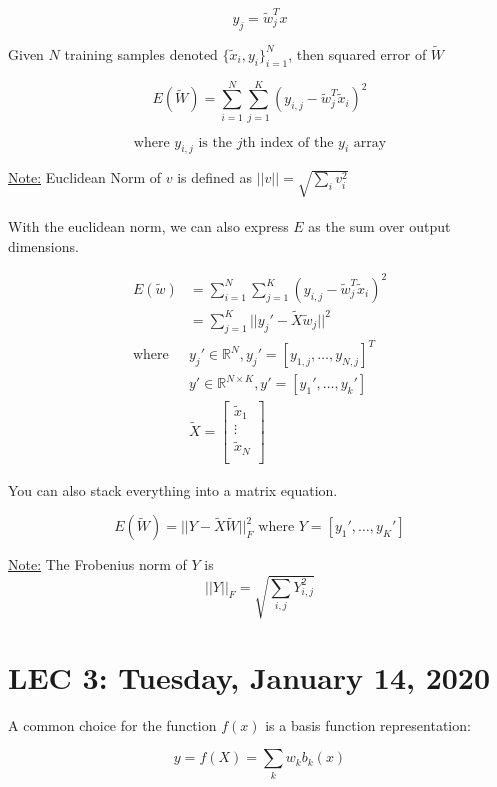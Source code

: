\documentclass[12pt]{article}
\begin{document}
$$y_j = \tilde{w}_j^T x$$

Given $N$ training samples denoted $\{ \tilde{x}_i, y_i \}^N_{i=1}$, then squared error of $\tilde{W}$

$$E(\tilde{W}) = \sum^N_{i=1} \sum^K_{j=1} (y_{i,j} - \tilde{w}_j^T \tilde{x}_i)^2$$

$$\text{where $y_{i,j}$ is the $j$th index of the $y_i$ array}$$

\underline{Note:} Euclidean Norm of $v$ is defined as $||v|| = \sqrt{\sum_i v_i^2}$
\\
\\
With the euclidean norm, we can also express $E$ as the sum over output dimensions.

\begin{align*}
    E(\tilde{w}) &= \sum^N_{i=1} \sum^K_{j=1} (y_{i,j} - \tilde{w}_j^T\tilde{x}_i)^2\\
    &= \sum^K_{j=1} ||y_j'- \tilde{X}\tilde{w}_j ||^2\\
    \text{where } & y_j' \in\mathbb{R}^N, y_j' = [y_{1,j},\dots, y_{N,j}]^T\\
                  & y' \in\mathbb{R}^{N \times K}, y' = [y_1',\dots, y_k']\\
                  & \tilde{X} = \begin{bmatrix}
  \tilde{x}_{1} \\
   \vdots \\
   \tilde{x}_{N}\\
 \end{bmatrix}
\end{align*}

You can also stack everything into a matrix equation.

$$E(\tilde{W}) = ||Y - \tilde{X}\tilde{W}||^2_F \text{ where } Y = [y_1',\dots, y_K']$$

\underline{Note:} The Frobenius norm of $Y$ is
$$||Y||_F = \sqrt{\sum_{i,j} Y^2_{i,j}}$$

\section{LEC 3: Tuesday, January 14, 2020}

A common choice for the function $f(x)$ is a basis function representation:

$$y = f(X) = \sum_k w_k b_k (x)$$
\end{document}
